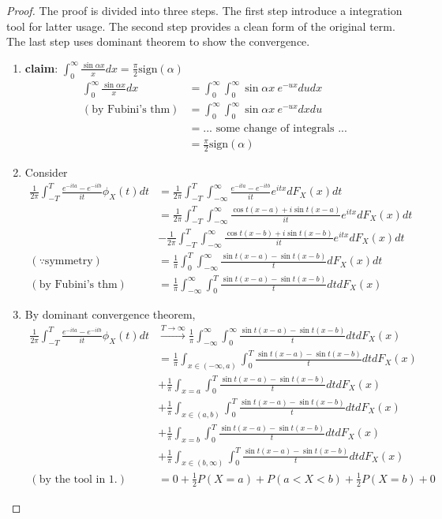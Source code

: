 \documentclass[11pt]{article}
\begin{document}
\begin{proof}
	The proof is divided into three steps. The first step introduce a integration tool for latter usage. The second step provides a clean form of the original term. The last step uses dominant theorem to show the convergence.
	\begin{enumerate}
		\item {\bf claim}: $\int_0^{\infty}\frac{\sin\alpha x}{x}dx = \frac{\pi}{2}\mbox{sign}(\alpha)$\\
		\begin{align*}
		\int_0^{\infty}\frac{\sin\alpha x}{x}dx &= \int_0^{\infty}\int_0^{\infty}\sin\alpha x\ e^{-ux}dudx\\
		(\mbox{by Fubini's thm})&=\int_0^{\infty}\int_0^{\infty}\sin\alpha x\ e^{-ux}dxdu\\
		&= ...\mbox{ some change of integrals }...\\
		&=\frac{\pi}{2}\mbox{sign}(\alpha)
		\end{align*}
		\item Consider
		\begin{align*}
		\frac{1}{2\pi}\int_{-T}^{T}\frac{e^{-ita}-e^{-itb}}{it}\phi_X(t)dt &= \frac{1}{2\pi}\int_{-T}^{T}\int_{-\infty}^{\infty}\frac{e^{-ita}-e^{-itb}}{it}e^{itx}dF_X(x)dt\\
		&=\frac{1}{2\pi}\int_{-T}^{T}\int_{-\infty}^{\infty}\frac{\cos t(x-a)+i\sin t(x-a)}{it}e^{itx}dF_X(x)dt\\
		&-\frac{1}{2\pi}\int_{-T}^{T}\int_{-\infty}^{\infty}\frac{\cos t(x-b)+i\sin t(x-b)}{it}e^{itx}dF_X(x)dt\\
		(\because\mbox{symmetry})&=\frac{1}{\pi}\int_0^{T}\int_{-\infty}^{\infty}\frac{\sin t(x-a) - \sin t(x-b)}{t}dF_X(x)dt\\
		(\mbox{by Fubini's thm})&=\frac{1}{\pi}\int_{-\infty}^{\infty}\int_0^{T}\frac{\sin t(x-a) - \sin t(x-b)}{t}dtdF_X(x)
		\end{align*}
		\item By dominant convergence theorem,
		\begin{align*}
		\frac{1}{2\pi}\int_{-T}^{T}\frac{e^{-ita}-e^{-itb}}{it}\phi_X(t)dt &\xrightarrow{T\rightarrow\infty}\frac{1}{\pi}\int_{-\infty}^{\infty}\int_0^{\infty}\frac{\sin t(x-a) - \sin t(x-b)}{t}dtdF_X(x)\\
		&=\frac{1}{\pi}\int_{x\in(-\infty,a)}\int_0^{T}\frac{\sin t(x-a) - \sin t(x-b)}{t}dtdF_X(x)\\
		&+\frac{1}{\pi}\int_{x=a}\int_0^{T}\frac{\sin t(x-a) - \sin t(x-b)}{t}dtdF_X(x)\\
		&+\frac{1}{\pi}\int_{x\in(a,b)}\int_0^{T}\frac{\sin t(x-a) - \sin t(x-b)}{t}dtdF_X(x)\\
		&+\frac{1}{\pi}\int_{x=b}\int_0^{T}\frac{\sin t(x-a) - \sin t(x-b)}{t}dtdF_X(x)\\
		&+\frac{1}{\pi}\int_{x\in(b,\infty)}\int_0^{T}\frac{\sin t(x-a) - \sin t(x-b)}{t}dtdF_X(x)\\
		(\mbox{by the tool in 1.})&=0+\frac{1}{2}P(X=a) + P(a<X<b) + \frac{1}{2}P(X=b) + 0
		\end{align*}
	\end{enumerate}
\end{proof}
\end{document}
